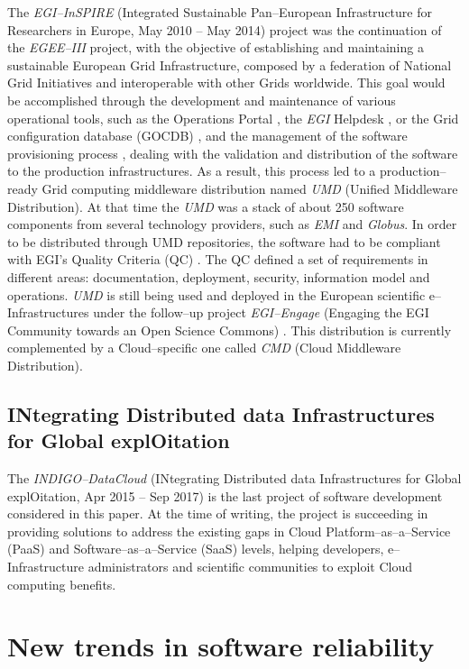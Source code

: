 \documentclass[journal]{IEEEtran}
\begin{document}
The {\sl EGI--InSPIRE} (Integrated Sustainable Pan--European Infrastructure for
Researchers in Europe, May 2010 -- May 2014) project \cite{cordis:egi-inspire}
was the continuation of the {\sl EGEE--III} project, with the objective of establishing and
maintaining a sustainable European Grid Infrastructure, composed by a federation of National
Grid Initiatives and interoperable with other Grids worldwide.
This goal would be accomplished through the
development and maintenance of various operational tools, such as the Operations Portal \cite{egi-ops},
the {\sl EGI} Helpdesk \cite{ggus}, or the Grid configuration database (GOCDB) \cite{gocdb}, and the
management of the software provisioning process \cite{mario}, dealing with the validation and distribution of the software to
the production infrastructures. As a result, this process led to a production--ready
Grid computing middleware distribution named {\sl UMD} (Unified Middleware Distribution). At that time the {\sl UMD}
was a stack of about 250 software components from several technology providers, such
as {\sl EMI} and {\sl Globus}. In order to be distributed through UMD
repositories, the software had to be compliant with EGI's Quality Criteria (QC) \cite{egi-qc}. The
QC defined a set of requirements in different areas: documentation, deployment, security, information
model and operations.
{\sl UMD} is still being used and
deployed in the European scientific e--Infrastructures under the follow--up
project {\sl EGI--Engage} (Engaging the EGI Community towards an Open Science
Commons) \cite{cordis:egi-engage}. This distribution is currently complemented
by a Cloud--specific one called {\sl CMD} (Cloud Middleware Distribution).

\subsection{INtegrating Distributed data Infrastructures for Global explOitation}

The {\sl INDIGO--DataCloud} (INtegrating Distributed data Infrastructures for Global
explOitation, Apr 2015 -- Sep 2017) \cite{cordis:indigo} is the last
project of software development considered in this paper. At the time of writing,
the project is succeeding in providing solutions to address the existing gaps in
Cloud Platform--as--a--Service (PaaS) and Software--as--a--Service (SaaS) levels,
helping developers, e--Infrastructure administrators and scientific communities to exploit
Cloud computing benefits.

\section{New trends in software reliability}
\label{sec:ntsr}
\end{document}
